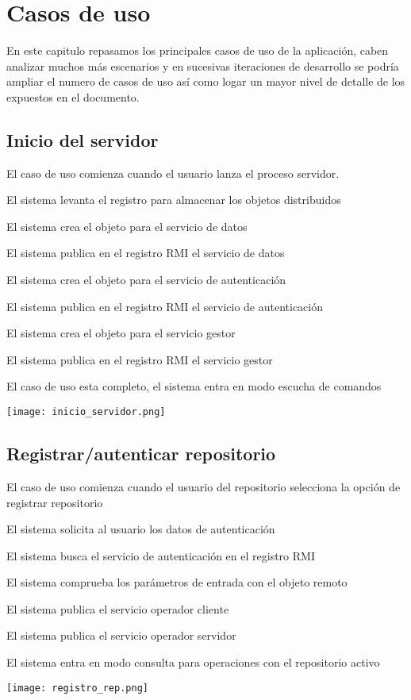 \chapter{Casos de uso}

En este capitulo repasamos los principales casos de uso de la aplicación, caben analizar muchos más escenarios y en sucesivas iteraciones de desarrollo se podría ampliar el numero de casos de uso así como logar un mayor nivel de detalle de los expuestos en el documento.

\section{Inicio del servidor}

\begin{compactenum}
	\item El caso de uso comienza cuando el usuario lanza el proceso servidor.
	\item El sistema levanta el registro para almacenar los objetos distribuidos
	\item El sistema crea el objeto para el servicio de datos
	\item El sistema publica en el registro RMI el servicio de datos
	\item El sistema crea el objeto para el servicio de autenticación
	\item El sistema publica en el registro RMI el servicio de autenticación
	\item El sistema crea el objeto para el servicio gestor
	\item El sistema publica en el registro RMI el servicio gestor
	\item El caso de uso esta completo, el sistema entra en modo escucha de comandos
\end{compactenum}
\texttt{[image: inicio\_servidor.png]}

\section{Registrar/autenticar repositorio}

\begin{compactenum}
	\item El caso de uso comienza cuando el usuario del repositorio selecciona la opción de registrar repositorio
	\item El sistema solicita al usuario los datos de autenticación
	\item El sistema busca el servicio de autenticación en el registro RMI
	\item El sistema comprueba los parámetros de entrada con el objeto remoto
	\item El sistema publica el servicio operador cliente
	\item El sistema publica el servicio operador servidor
	\item El sistema entra en modo consulta para operaciones con el repositorio activo
\end{compactenum}
\texttt{[image: registro\_rep.png]}


